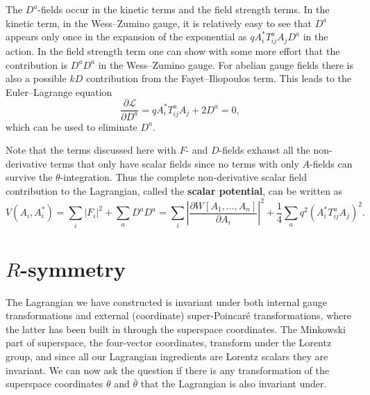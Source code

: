 \documentclass[notes.tex]{subfiles}
\begin{document}
The $D^a$-fields occur in the kinetic terms and the field strength terms.  In the kinetic term, in the Wess--Zumino gauge, it is relatively easy to see that $D^a$ appears only once in the expansion of the exponential as $qA_i^*T_{ij}^aA_jD^a$ in the action. In the field strength term one can show with some more effort that the contribution is $D^aD^a$ in the Wess--Zumino gauge. For abelian gauge fields there is also a possible $kD$ contribution from the Fayet--Iliopoulos term. This leads to the Euler--Lagrange  equation 
\[\frac{\partial \mathcal{L}}{\partial D^a} = qA_i^*T_{ij}^aA_j + 2D^a = 0,\]
which can be used to eliminate $D^a$.

Note that the terms discussed here with $F$- and $D$-fields exhaust all the non-derivative terms that only have scalar fields since no terms with only $A$-fields can survive the $\theta$-integration. Thus the complete non-derivative scalar field contribution to the Lagrangian, called the {\bf scalar potential}, can be written as
\begin{equation}
V(A_i, A_i^*) = \sum_i |F_i|^2+\sum_a D^aD^a = \sum_i\left|\frac{\partial W[A_1,... ,A_n]}{\partial A_i}\right|^2+ \frac{1}{4} \sum_a q^2 (A_i^*T_{ij}^aA_j)^2.
\label{eq:scalarpotglobal}
\end{equation}



\section{$R$-symmetry}
\label{sec:R_symmetry}
The Lagrangian we have constructed is invariant under both internal gauge transformations and external (coordinate) super-Poincaré transformations, where the latter has been built in through the superspace coordinates. The Minkowski part of superspace, the four-vector coordinates, transform under the Lorentz group, and since all our Lagrangian ingredients are Lorentz scalars they are invariant. We can now ask the question if there is any transformation of the superspace coordinates $\theta$ and $\bar\theta$ that the Lagrangian is also invariant under. 
\end{document}
